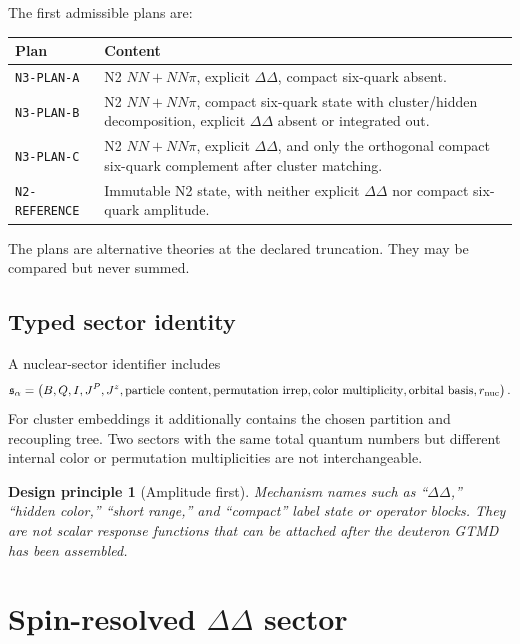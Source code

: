\documentclass[11pt]{article}
\newtheorem{principle}[definition]{Design principle}
\begin{document}
The first admissible plans are:
\begin{longtable}{L{0.20\textwidth}L{0.72\textwidth}}
\toprule
Plan & Content \\
\midrule
\endhead
\texttt{N3-PLAN-A} & N2 \(NN+NN\pi\), explicit \(\Delta\Delta\), compact six-quark absent. \\
\texttt{N3-PLAN-B} & N2 \(NN+NN\pi\), compact six-quark state with cluster/hidden decomposition, explicit \(\Delta\Delta\) absent or integrated out. \\
\texttt{N3-PLAN-C} & N2 \(NN+NN\pi\), explicit \(\Delta\Delta\), and only the orthogonal compact six-quark complement after cluster matching. \\
\texttt{N2-REFERENCE} & Immutable N2 state, with neither explicit \(\Delta\Delta\) nor compact six-quark amplitude. \\
\bottomrule
\end{longtable}
The plans are alternative theories at the declared truncation.  They may be compared but never summed.

\subsection{Typed sector identity}

A nuclear-sector identifier includes
\begin{equation}
 \mathfrak s_\alpha=
 \left(
 B,Q,I,J^P,J^z,
 \text{particle content},
 \text{permutation irrep},
 \text{color multiplicity},
 \text{orbital basis},
 r_{\rm nuc}
 \right).
\label{eq:sector-id}
\end{equation}
For cluster embeddings it additionally contains the chosen partition and recoupling tree.  Two sectors with the same total quantum numbers but different internal color or permutation multiplicities are not interchangeable.

\begin{principle}[Amplitude first]
Mechanism names such as ``\(\Delta\Delta\),'' ``hidden color,'' ``short range,'' and ``compact'' label state or operator blocks.  They are not scalar response functions that can be attached after the deuteron GTMD has been assembled.
\label{pr:amplitude-first}
\end{principle}

\section{Spin-resolved \texorpdfstring{\(\Delta\Delta\)}{DeltaDelta} sector}
\label{sec:deltadelta}
\end{document}
